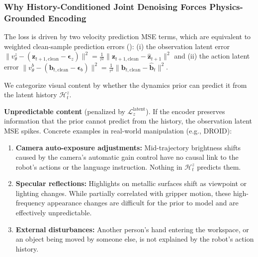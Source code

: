 \documentclass{article}
\newcommand{\vz}{\bm{z}}
\newcommand{\vb}{\bm{b}}
\newcommand{\vep}{\bm{\epsilon}}
\newcommand{\loss}{\mathcal{L}}
\begin{document}
\subsubsection{Why History-Conditioned Joint Denoising Forces Physics-Grounded Encoding}

The loss is driven by two velocity prediction MSE terms, which are equivalent to weighted clean-sample prediction errors (): (i) the observation latent error $\|v_\theta^z - (\vz_{t+1,\text{clean}} - \vep_z)\|^2 = \frac{1}{\tau^2}\|\vz_{t+1,\text{clean}} - \hat{\vz}_{t+1}\|^2$ and (ii) the action latent error $\|v_\theta^b - (\vb_{t,\text{clean}} - \vep_b)\|^2 = \frac{1}{\tau^2}\|\vb_{t,\text{clean}} - \hat{\vb}_t\|^2$.

We categorize visual content by whether the dynamics prior can predict it from the latent history $\mathcal{H}_t^z$.

\textbf{Unpredictable content} (penalized by $\loss_z^{\text{latent}}$). If the encoder preserves information that the prior cannot predict from the history, the observation latent MSE spikes. Concrete examples in real-world manipulation (e.g., DROID):
\begin{enumerate}[leftmargin=*]
  \item \textbf{Camera auto-exposure adjustments:} Mid-trajectory brightness shifts caused by the camera's automatic gain control have no causal link to the robot's actions or the language instruction. Nothing in $\mathcal{H}_t^z$ predicts them.

  \item \textbf{Specular reflections:} Highlights on metallic surfaces shift as viewpoint or lighting changes. While partially correlated with gripper motion, these high-frequency appearance changes are difficult for the prior to model and are effectively unpredictable.

  \item \textbf{External disturbances:} Another person's hand entering the workspace, or an object being moved by someone else, is not explained by the robot's action history.
\end{enumerate}
\end{document}
